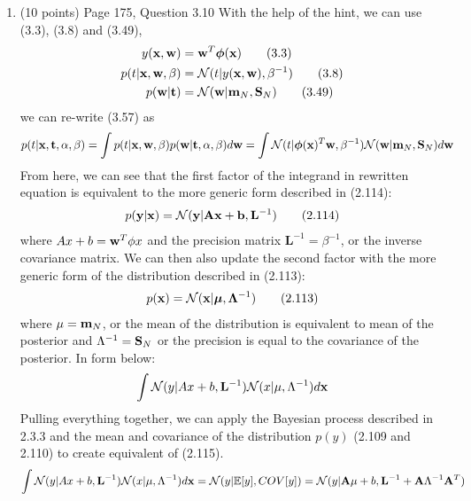 \documentclass[11pt]{article}
\begin{document}
\begin{enumerate}
\item (10 points) Page 175, Question 3.10
With the help of the hint, we can use (3.3), (3.8) and (3.49),
\begin{align*}
y(\mathbf{x}, \mathbf{w}) &= \mathbf{w}^T \bm{\phi}(\mathbf{x}) \tag{3.3}\\
p(t|\mathbf{x}, \mathbf{w}, \beta) &= \mathcal N (t|y(\mathbf{x}, \mathbf{w}), \beta^{-1}) \tag{3.8}\\
p(\mathbf{w} | \mathbf{t}) &= \mathcal N(\mathbf{w} | \mathbf{m}_N, \mathbf{S}_N) \tag{3.49}
\end{align*}
we can re-write (3.57) as
\begin{align*}
p(t|\mathbf{x}, \mathbf{t}, \alpha, \beta) 
&= \int p(t| \mathbf{x}, \mathbf{w}, \beta) p(\mathbf{w} | \mathbf{t}, \alpha, \beta) d \mathbf{w}
= \int \mathcal N (t | \bm{\phi}(\mathbf{x})^T \mathbf{w}, \beta^{-1}) 
\mathcal N (\mathbf{w} | \mathbf{m}_N, \mathbf{S}_N) d \mathbf{w} 
\end{align*}
From here, we can see that the first factor of the integrand in rewritten equation is equivalent to the more 
generic form described in (2.114):
\begin{align*}
      p(\mathbf y | \mathbf{x}) = \mathcal N (\mathbf{y} | \mathbf A \mathbf{x} + \mathbf b, \mathbf L^{-1}) \tag{2.114}
\end{align*}
where $Ax+b = \mathbf{w}^T \phi x$ and the precision matrix $\mathbf L^{-1} = \beta^{-1}$, or the inverse covariance matrix. 
We can then also update the second factor with the more generic form of the distribution described in (2.113):
\begin{align*}
      p(\mathbf{x})             = \mathcal N (\mathbf{x} | \bm{\mu}, \bm \Lambda^{-1}) \tag{2.113}\\
\end{align*}
where $\mu = \mathbf{m}_N$, or the mean of the distribution is equivalent to mean of the posterior and $\Lambda^{-1} = \mathbf{S}_N$
or the precision is equal to the covariance of the posterior. In form below:
\begin{align*}
   \int \mathcal N (y | Ax+b, \mathbf{L}^{-1}) 
      \mathcal N (x | \mu, \Lambda^{-1}) d \mathbf{x}    
\end{align*}
Pulling everything together, we can apply the Bayesian process described in 2.3.3 and the mean and covariance of 
the distribution $p(y)$ (2.109 and 2.110) to create equivalent of (2.115).
\begin{align*}
   \int \mathcal N (y | Ax+b, \mathbf{L}^{-1}) 
      \mathcal N (x | \mu, \Lambda^{-1}) d \mathbf{x} = \mathcal N (y | \mathbb{E} [y], COV[y]) =
      \mathcal N (y | \mathbf{A}\mu + b, \mathbf{L}^{-1} + \mathbf{A} \Lambda^{-1} \mathbf{A}^T)
\end{align*}



\end{enumerate}
\end{document}
